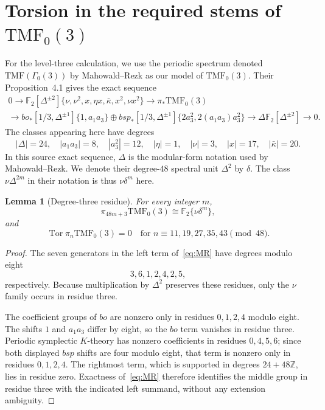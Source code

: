 \documentclass[11pt,a4paper]{amsart}
\newcommand{\Z}{\mathbb Z}
\newcommand{\F}{\mathbb F}
\newcommand{\TMF}{\mathrm{TMF}}
\newcommand{\Tor}{\operatorname{Tor}}
\theoremstyle{plain}
\newtheorem{lemma}[theorem]{Lemma}
\theoremstyle{definition}
\theoremstyle{remark}
\begin{document}






\section{Torsion in the required stems of \texorpdfstring{$\TMF_0(3)$}{TMF0(3)}}

For the level-three calculation, we use the periodic spectrum denoted
$\TMF(\Gamma_0(3))$ by Mahowald--Rezk as our model of $\TMF_0(3)$.
Their Proposition~4.1 \cite{MR} gives the exact sequence
\begin{multline}\label{eq:MR}
0\longrightarrow
 \F_2[\Delta^{\pm2}]\{\nu,\nu^2,x,\eta x,\bar\kappa,x^2,\nu x^2\}
 \longrightarrow \pi_*\TMF_0(3)\\
 \longrightarrow
 bo_*[1/3,\Delta^{\pm1}]\{1,a_1a_3\}
 \oplus
 bsp_*[1/3,\Delta^{\pm1}]\{2a_3^2,2(a_1a_3)a_3^2\}
 \longrightarrow \Delta\F_2[\Delta^{\pm2}]\longrightarrow0.
\end{multline}
The classes appearing here have degrees
\[
 |\Delta|=24,\quad |a_1a_3|=8,\quad |a_3^2|=12,
 \quad |\eta|=1,\quad |\nu|=3,\quad |x|=17,
 \quad |\bar\kappa|=20.
\]
In this source exact sequence, $\Delta$ is the modular-form notation
used by Mahowald--Rezk. We denote their degree-$48$ spectral unit
$\Delta^2$ by $\delta$. The class $\nu\Delta^{2m}$ in their notation
is thus $\nu\delta^m$ here.

\begin{lemma}[Degree-three residue]\label{lem:MR-residue}
For every integer $m$,
\[
 \pi_{48m+3}\TMF_0(3)\cong\F_2\{\nu\delta^m\},
\]
and
\[
 \Tor\pi_n\TMF_0(3)=0
 \quad\text{for }n\equiv11,19,27,35,43\pmod{48}.
\]
\end{lemma}

\begin{proof}
The seven generators in the left term of~\eqref{eq:MR} have degrees
modulo eight
\[
 3,6,1,2,4,2,5,
\]
respectively. Because multiplication by $\Delta^{2}$ preserves these
residues, only the $\nu$ family occurs in residue three.

The coefficient groups of $bo$ are nonzero only in residues
$0,1,2,4$ modulo eight. The shifts $1$ and $a_1a_3$ differ by eight,
so the $bo$ term vanishes in residue three. Periodic symplectic
$K$-theory has nonzero coefficients in residues $0,4,5,6$; since
both displayed $bsp$ shifts are four modulo eight, that term is
nonzero only in residues $0,1,2,4$. The rightmost term, which is
supported in degrees $24+48\Z$, lies in residue zero. Exactness
of~\eqref{eq:MR} therefore identifies the middle group in residue
three with the indicated left summand, without any extension ambiguity.
\end{proof}
\end{document}
